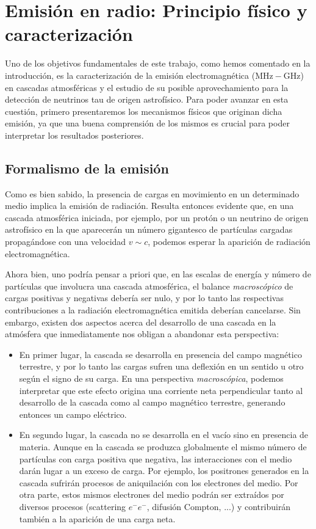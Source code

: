 \documentclass[11 pt, a4paper]{article} %
\numberwithin{equation}{section}
\numberwithin{figure}{section}
\numberwithin{table}{section}
\begin{document}
	\section{Emisión en radio: Principio físico y caracterización}\label{sec3}
	Uno de los objetivos fundamentales de este trabajo, como hemos comentado en la introducción, es la caracterización de la emisión electromagnética ($\mathrm{MHz-GHz}$) en cascadas atmosféricas y el estudio de su posible aprovechamiento para la detección de neutrinos tau de origen astrofísico. Para poder avanzar en esta cuestión, primero presentaremos los mecanismos físicos que originan dicha emisión, ya que una buena comprensión de los mismos es crucial para poder interpretar los resultados posteriores.
	\subsection{Formalismo de la emisión}\label{sec31}
	Como es bien sabido, la presencia de cargas en movimiento en un determinado medio implica la emisión de radiación. Resulta entonces evidente que, en una cascada atmosférica iniciada, por ejemplo, por un protón o un neutrino de origen astrofísico en la que aparecerán un número gigantesco de partículas cargadas propagándose con una velocidad $v\sim c$, podemos esperar la aparición de radiación electromagnética.
	
	Ahora bien, uno podría pensar a priori que, en las escalas de energía y número de partículas que involucra una cascada atmosférica, el balance \textit{macroscópico} de cargas positivas y negativas debería ser nulo, y por lo tanto las respectivas contribuciones a la radiación electromagnética emitida deberían cancelarse. Sin embargo, existen dos aspectos acerca del desarrollo de una cascada en la atmósfera que inmediatamente nos obligan a abandonar esta perspectiva:
	\begin{itemize}
		\item En primer lugar, la cascada se desarrolla en presencia del campo magnético terrestre, y por lo tanto las cargas sufren una deflexión en un sentido u otro según el signo de su carga. En una perspectiva \textit{macroscópica}, podemos interpretar que este efecto origina una corriente neta perpendicular tanto al desarrollo de la cascada como al campo magnético terrestre, generando entonces un campo eléctrico.
		\item En segundo lugar, la cascada no se desarrolla en el vacío sino en presencia de materia. Aunque en la cascada se produzca globalmente el mismo número de partículas con carga positiva que negativa, las interacciones con el medio darán lugar a un exceso de carga. Por ejemplo, los positrones generados en la cascada sufrirán procesos de aniquilación con los electrones del medio. Por otra parte, estos mismos electrones del medio podrán ser extraídos por diversos procesos (scattering $e^-e^-$, difusión Compton, ...) y contribuirán también a la aparición de una carga neta. 
	\end{itemize}
\end{document}
